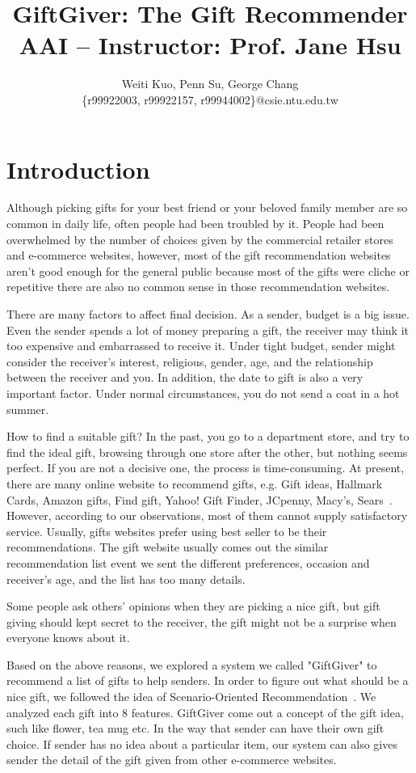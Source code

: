 \documentclass[11pt,twocolumn]{article}
\title{GiftGiver: The Gift Recommender \\ {\small AAI --
    Instructor: Prof. Jane Hsu}}
\author{Weiti Kuo, Penn Su, George Chang \\ \{r99922003, r99922157, r99944002\}@csie.ntu.edu.tw}
\begin{document}
\maketitle

\section{Introduction}

Although picking gifts for your best friend or your beloved family member are so common in daily life, often people had been troubled by it. People had been overwhelmed by the number of choices given by the commercial retailer stores and e-commerce websites, however, most of the gift recommendation websites aren't good enough for the general public because most of the gifts were cliche or repetitive there are also no common sense in those recommendation websites.

There are many factors to affect final decision. As a sender, budget is a big issue. Even the sender spends a lot of money preparing a gift, the receiver may think it too expensive and embarrassed to receive it.   Under tight budget, sender might consider the receiver's interest, religious, gender, age, and the relationship between the receiver and you. In addition, the date to gift is also a very important factor. Under normal circumstances, you do not send a coat in a hot summer.

How to find a suitable gift? In the past, you go to a department store, and try to find the ideal gift, browsing through one store after the other, but nothing seems perfect. If you are not a decisive one, the process is time-consuming. At present, there are many online website to recommend gifts, e.g. Gift ideas, Hallmark Cards, Amazon gifts, Find gift, Yahoo! Gift Finder, JCpenny, Macy's, Sears~\cite{JCpenny, Macy's, Sears, Yahoo, Hallmark, Gift, Find, Amazon}. However, according to our observations, most of them cannot supply satisfactory service. Usually, gifts websites prefer using best seller to be their recommendations. The gift website usually comes out the similar recommendation list event we sent the different preferences, occasion and receiver’s age, and the list has too many details.

Some people ask others' opinions when they are picking a nice gift, but gift giving should kept secret to the receiver, the gift might not be a surprise when everyone knows about it.

Based on the above reasons, we explored a system we called "GiftGiver" to recommend a list of gifts to help senders. In order to figure out what should be a nice gift,  we followed the idea of Scenario-Oriented Recommendation~\cite{Shen}.   We analyzed each gift into 8 features. GiftGiver come out a concept of the gift idea, such like flower, tea mug etc.  In the way that sender can have their own gift choice.  If sender has no idea about a particular item, our system can also gives sender the detail of the gift given from other e-commerce websites.
\end{document}
